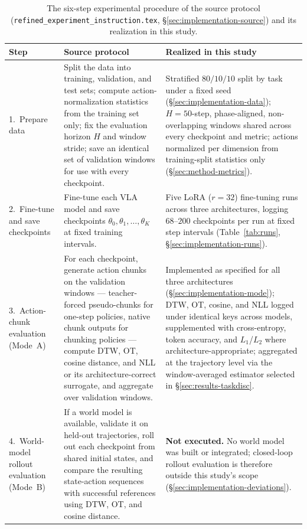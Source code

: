 \documentclass[11pt]{article}
\numberwithin{equation}{section}
\numberwithin{table}{section}
\numberwithin{figure}{section}
\begin{document}
\begin{table}[h]
\centering
\footnotesize
\caption{The six-step experimental procedure of the source protocol
(\texttt{refined\_experiment\_instruction.tex}, \S\ref{sec:implementation-source}) and its realization in
this study.}
\label{tab:impl-steps}
\begin{tabular}{p{1.6cm}p{5.6cm}p{6.3cm}}
\toprule
Step & Source protocol & Realized in this study \\
\midrule
1.\ Prepare data &
Split the data into training, validation, and test sets; compute action-normalization statistics from
the training set only; fix the evaluation horizon $H$ and window stride; save an identical set of
validation windows for use with every checkpoint. &
Stratified $80/10/10$ split by task under a fixed seed (\S\ref{sec:implementation-data}); $H{=}50$-step,
phase-aligned, non-overlapping windows shared across every checkpoint and metric; actions normalized per
dimension from training-split statistics only (\S\ref{sec:method-metrics}). \\
2.\ Fine-tune and save checkpoints &
Fine-tune each VLA model and save checkpoints $\theta_0,\theta_1,\ldots,\theta_K$ at fixed training
intervals. &
Five LoRA ($r{=}32$) fine-tuning runs across three architectures, logging $68$--$200$ checkpoints per run
at fixed step intervals (Table~\ref{tab:runs}, \S\ref{sec:implementation-runs}). \\
3.\ Action-chunk evaluation (Mode~A) &
For each checkpoint, generate action chunks on the validation windows --- teacher-forced pseudo-chunks
for one-step policies, native chunk outputs for chunking policies --- compute DTW, OT, cosine distance,
and NLL or its architecture-correct surrogate, and aggregate over validation windows. &
Implemented as specified for all three architectures (\S\ref{sec:implementation-mode}); DTW, OT, cosine,
and NLL logged under identical keys across models, supplemented with cross-entropy, token accuracy, and
$L_1$/$L_2$ where architecture-appropriate; aggregated at the trajectory level via the window-averaged
estimator selected in \S\ref{sec:results-taskdisc}. \\
4.\ World-model rollout evaluation (Mode~B) &
If a world model is available, validate it on held-out trajectories, roll out each checkpoint from
shared initial states, and compare the resulting state-action sequences with successful references using
DTW, OT, and cosine distance. &
\textbf{Not executed.} No world model was built or integrated; closed-loop rollout evaluation is
therefore outside this study's scope (\S\ref{sec:implementation-deviations}). \\

\end{tabular}
\end{table}
\end{document}
